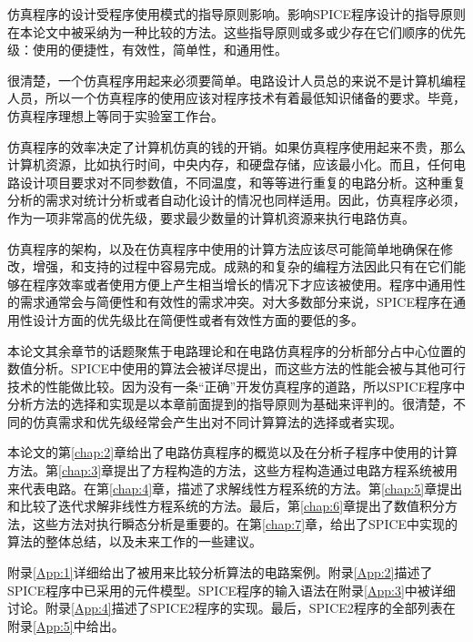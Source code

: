 仿真程序的设计受程序使用模式的指导原则影响。影响SPICE程序设计的指导原则在本论文中被采纳为一种比较的方法。这些指导原则或多或少存在它们顺序的优先级：使用的便捷性，有效性，简单性，和通用性。

很清楚，一个仿真程序用起来必须要简单。电路设计人员总的来说不是计算机编程人员，所以一个仿真程序的使用应该对程序技术有着最低知识储备的要求。毕竟，仿真程序理想上等同于实验室工作台。

仿真程序的效率决定了计算机仿真的钱的开销。如果仿真程序使用起来不贵，那么计算机资源，比如执行时间，中央内存，和硬盘存储，应该最小化。而且，任何电路设计项目要求对不同参数值，不同温度，和等等进行重复的电路分析。这种重复分析的需求对统计分析或者自动化设计的情况也同样适用。因此，仿真程序必须，作为一项非常高的优先级，要求最少数量的计算机资源来执行电路仿真。

仿真程序的架构，以及在仿真程序中使用的计算方法应该尽可能简单地确保在修改，增强，和支持的过程中容易完成。成熟的和复杂的编程方法因此只有在它们能够在程序效率或者使用方便上产生相当增长的情况下才应该被使用。程序中通用性的需求通常会与简便性和有效性的需求冲突。对大多数部分来说，SPICE程序在通用性设计方面的优先级比在简便性或者有效性方面的要低的多。

本论文其余章节的话题聚焦于电路理论和在电路仿真程序的分析部分占中心位置的数值分析。SPICE中使用的算法会被详尽提出，而这些方法的性能会被与其他可行技术的性能做比较。因为没有一条“正确”开发仿真程序的道路，所以SPICE程序中分析方法的选择和实现是以本章前面提到的指导原则为基础来评判的。很清楚，不同的仿真需求和优先级经常会产生出对不同计算算法的选择或者实现。

本论文的第\ref{chap:2}章给出了电路仿真程序的概览以及在分析子程序中使用的计算方法。第\ref{chap:3}章提出了方程构造的方法，这些方程构造通过电路方程系统被用来代表电路。在第\ref{chap:4}章，描述了求解线性方程系统的方法。第\ref{chap:5}章提出和比较了迭代求解非线性方程系统的方法。最后，第\ref{chap:6}章提出了数值积分方法，这些方法对执行瞬态分析是重要的。在第\ref{chap:7}章，给出了SPICE中实现的算法的整体总结，以及未来工作的一些建议。

附录\ref{App:1}详细给出了被用来比较分析算法的电路案例。附录\ref{App:2}描述了SPICE程序中已采用的元件模型。SPICE程序的输入语法在附录\ref{App:3}中被详细讨论。附录\ref{App:4}描述了SPICE2程序的实现。最后，SPICE2程序的全部列表在附录\ref{App:5}中给出。
